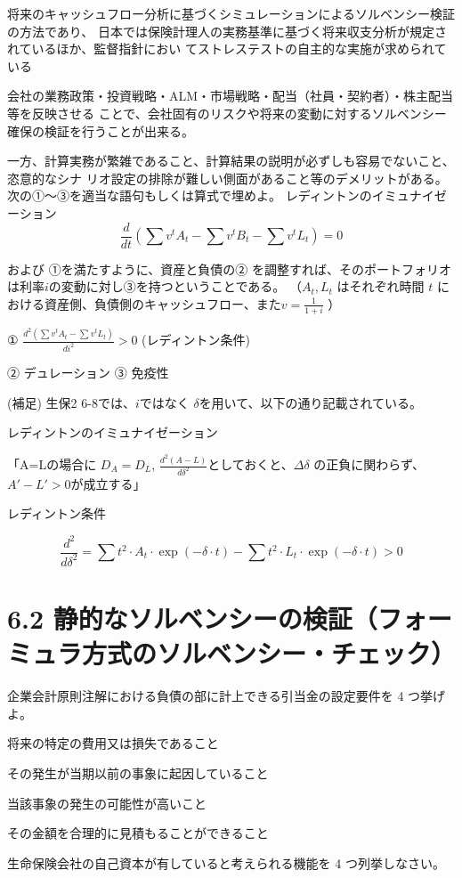 \documentclass[report,gutter=10mm,fore-edge=10mm,uplatex,dvipdfmx]{jlreq}
\begin{document}
 将来のキャッシュフロー分析に基づくシミュレーションによるソルベンシー検証の方法であり、
日本では保険計理人の実務基準に基づく将来収支分析が規定されているほか、監督指針におい
てストレステストの自主的な実施が求められている

 会社の業務政策・投資戦略・ALM・市場戦略・配当（社員・契約者）・株主配当等を反映させる
ことで、会社固有のリスクや将来の変動に対するソルベンシー確保の検証を行うことが出来る。

 一方、計算実務が繁雑であること、計算結果の説明が必ずしも容易でないこと、恣意的なシナ
リオ設定の排除が難しい側面があること等のデメリットがある。
次の①～③を適当な語句もしくは算式で埋めよ。
レディントンのイミュナイゼーション
$$
\frac{d}{dt}(\sum v^tA_t-\sum v^tB_t-\sum v^tL_t)=0
$$

および
①を満たすように、資産と負債の②
を調整すれば、そのポートフォリオは利率$i$の変動に対し③を持つということである。
（$A_t, L_t$ はそれぞれ時間 $t$ における資産側、負債側のキャッシュフロー、また$v=\frac{1}{1+i}$ ）

\answer{}
① $\frac{d^2(\sum v^tA_t - \sum v^tL_t )}{di^2}>0$
(レディントン条件)

② デュレーション
③ 免疫性


(補足) 生保2 6-8では、$i$ではなく $\delta$を用いて、以下の通り記載されている。

レディントンのイミュナイゼーション

「A=Lの場合に $D_A=D_L$, $\frac{d^2(A-L)}{d\delta^2}$としておくと、$\Delta\delta$ の正負に関わらず、$A'-L'>0$が成立する」

レディントン条件

$$
\frac{d^2}{d\delta^2}=\sum t^2\cdot A_t \cdot \exp(-\delta\cdot t)-\sum t^2\cdot L_t \cdot\exp(-\delta\cdot t)>0
$$

\section{6.2 静的なソルベンシーの検証（フォーミュラ方式のソルベンシー・チェック）}
企業会計原則注解における負債の部に計上できる引当金の設定要件を 4 つ挙げよ。
\answer{}

将来の特定の費用又は損失であること

その発生が当期以前の事象に起因していること

当該事象の発生の可能性が高いこと

その金額を合理的に見積もることができること

生命保険会社の自己資本が有していると考えられる機能を 4 つ列挙しなさい。
\end{document}
